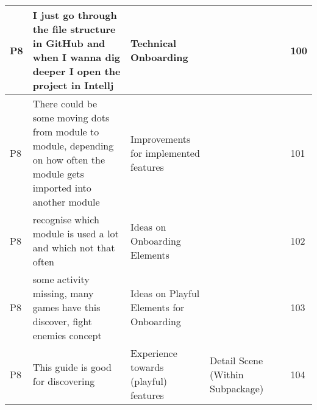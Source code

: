 \begin{appendices}
\begin{landscape}
\begin{longtable}{|p{0.8cm}|p{7cm}|p{3cm}|p{3cm}|p{5.5cm}|p{0.5cm}|}
      P8                   & I just go through the file structure in GitHub and when I wanna dig deeper I open the project in Intellj                                                                                                                                                                    & Technical Onboarding                     &                                    &                                                                                                                                                    & 100          \\ \hline
      P8                   & There could be some moving dots from module to module, depending on how often the module gets imported into another module                                                                                                                                                  & Improvements for implemented features    &                                    &                                                                                                                                                    & 101          \\ \hline
      P8                   & recognise which module is used a lot and which not that often                                                                                                                                                                                                               & Ideas on Onboarding Elements             &                                    &                                                                                                                                                    & 102          \\ \hline
      P8                   & some activity missing, many games have this discover, fight enemies concept                                                                                                                                                                                                 & Ideas on Playful Elements for Onboarding &                                    &                                                                                                                                                    & 103          \\ \hline
      P8                   & This guide is good for discovering                                                                                                                                                                                                                                          & Experience towards (playful) features    & Detail Scene (Within Subpackage)   &                                                                                                                                                    & 104          \\ \hline

\end{longtable}
\end{landscape}
\end{appendices}

